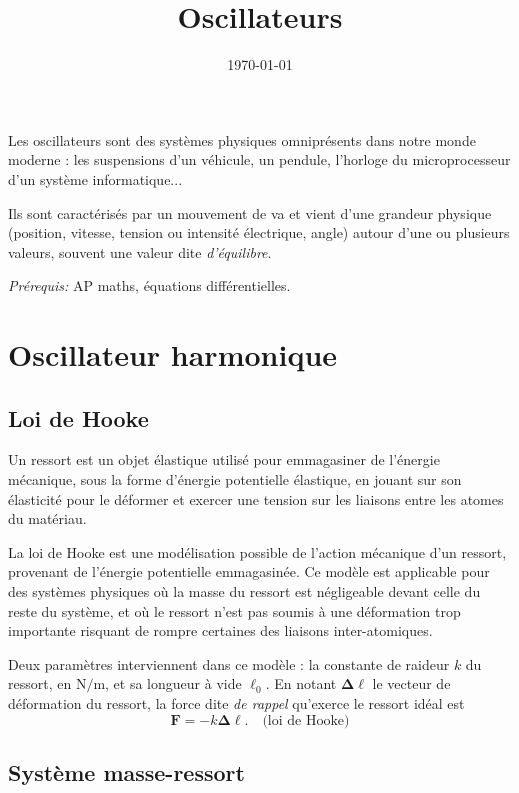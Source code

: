 \documentclass{article}
\title{Oscillateurs}
\author{}
\date{\today}
\renewcommand{\vec}[1]{\boldsymbol{\mathbf{#1}}}
\theoremstyle{definition}
\begin{document}
\maketitle

    Les oscillateurs sont des systèmes physiques omniprésents dans notre monde moderne : les suspensions d'un véhicule, un pendule, l'horloge du microprocesseur d'un système informatique...

    Ils sont caractérisés par un mouvement de va et vient d'une grandeur physique (position, vitesse, tension ou intensité électrique, angle) autour d'une ou plusieurs valeurs, souvent une valeur dite \textit{d'équilibre}.

\noindent\textit{Prérequis:} AP maths, équations différentielles.

\section{Oscillateur harmonique}

\subsection{Loi de Hooke}

Un ressort est un objet élastique utilisé pour emmagasiner de l'énergie mécanique, sous la forme d'énergie potentielle élastique, en jouant sur son élasticité pour le déformer et exercer une tension sur les liaisons entre les atomes du matériau.

La loi de Hooke est une modélisation possible de l'action mécanique d'un ressort, provenant de l'énergie potentielle emmagasinée. Ce modèle est applicable pour des systèmes physiques où la masse du ressort est négligeable devant celle du reste du système, et où le ressort n'est pas soumis à une déformation trop importante risquant de rompre certaines des liaisons inter-atomiques.

Deux paramètres interviennent dans ce modèle : la constante de raideur $k$ du ressort, en $\si{\newton\per\metre} $, et sa longueur à vide $\ell_0$. En notant $\vec{\Delta\ell}$ le vecteur de déformation du ressort, la force dite \textit{de rappel} qu'exerce le ressort idéal est
	\[
    \vec{F} = -k\vec{\Delta\ell}. \quad \text{(loi de Hooke)}
    \]

\subsection{Système masse-ressort}
\end{document}
